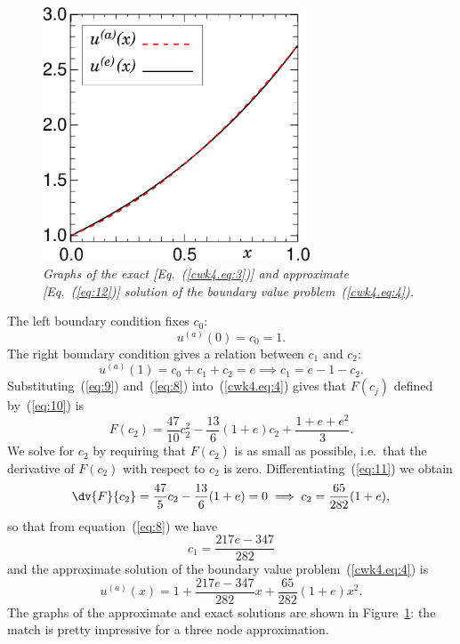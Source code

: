 \begin{figure}
  \centerline{\includegraphics[width=80mm]{figures/ColloEner}}
  \caption{\label{fig:ColloEner} \it Graphs of the exact
    [Eq.~(\ref{cwk4.eq:3})] and approximate [Eq.~(\ref{eq:12})]
    solution of the boundary value problem~(\ref{cwk4.eq:4}).}
\end{figure}

The left boundary condition fixes $c_0$:
%
\begin{equation}
  u^{(a)}(0) = c_0 = 1 .
  \label{eq:9}
\end{equation}
%
The right boundary condition gives a relation between $c_1$ and $c_2$:
%
\begin{equation}
  u^{(a)}(1) = c_0 + c_1 + c_2 = e \implies c_1 = e - 1 - c_2 .
  \label{eq:8}
\end{equation}
%
Substituting~(\ref{eq:9}) and~(\ref{eq:8}) into~(\ref{cwk4.eq:4})
gives that $F(c_j)$ defined by~(\ref{eq:10}) is
%
\begin{equation}
  F(c_2) = \frac{47}{10} c_2^2 - \frac{13}{6}(1+e)c_2 + \frac{1+e+e^2}{3} .
  \label{eq:11}
\end{equation}
%
We solve for $c_2$ by requiring that $F(c_2)$ is as small as possible,
i.e.\ that the derivative of $F(c_2)$ with respect to $c_2$ is zero.
Differentiating~(\ref{eq:11}) we obtain
%
\begin{equation*}
 \dv{F}{c_2} = \frac{47}{5} c_2 - \frac{13}{6}(1+e) = 0 \implies
 c_2 = \frac{65}{282}(1+e) ,
\end{equation*}
%
so that from equation~(\ref{eq:8}) we have
%
\begin{equation*}
  c_1 = \frac{217 e - 347}{282}
\end{equation*}
%
and the approximate solution of the boundary value
problem~(\ref{cwk4.eq:4}) is
%
\begin{equation}
  u^{(a)}(x) = 1 + \frac{217 e - 347}{282} x + \frac{65}{282}(1+e) x^2 .
  \label{eq:12}
\end{equation}
%
The graphs of the approximate and exact solutions are shown in
Figure~\ref{fig:ColloEner}: the match is pretty impressive for a three
node approximation.

